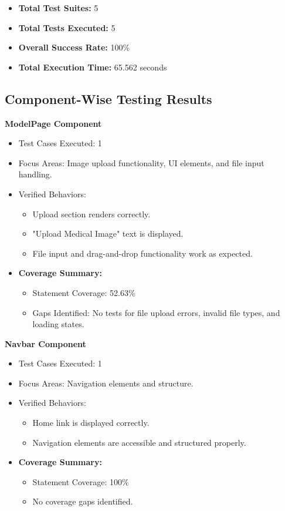 \documentclass[12pt, titlepage]{article}
\begin{document}
\begin{itemize}
    \item \textbf{Total Test Suites:} 5
    \item \textbf{Total Tests Executed:} 5
    \item \textbf{Overall Success Rate:} 100\%
    \item \textbf{Total Execution Time:} 65.562 seconds
\end{itemize}

\subsection{Component-Wise Testing Results}

\textbf{ModelPage Component}
\begin{itemize}
    \item Test Cases Executed: 1
    \item Focus Areas: Image upload functionality, UI elements, and file input handling.
    \item Verified Behaviors:
    \begin{itemize}
        \item Upload section renders correctly.
        \item "Upload Medical Image" text is displayed.
        \item File input and drag-and-drop functionality work as expected.
    \end{itemize}
    \item \textbf{Coverage Summary:}
    \begin{itemize}
        \item Statement Coverage: 52.63\%
        \item Gaps Identified: No tests for file upload errors, invalid file types, and loading states.
    \end{itemize}
\end{itemize}

\textbf{Navbar Component}
\begin{itemize}
    \item Test Cases Executed: 1
    \item Focus Areas: Navigation elements and structure.
    \item Verified Behaviors:
    \begin{itemize}
        \item Home link is displayed correctly.
        \item Navigation elements are accessible and structured properly.
    \end{itemize}
    \item \textbf{Coverage Summary:}
    \begin{itemize}
        \item Statement Coverage: 100\%
        \item No coverage gaps identified.
    \end{itemize}
\end{itemize}
\end{document}
